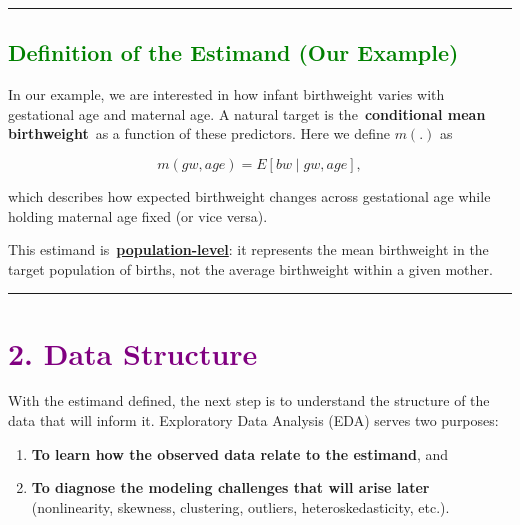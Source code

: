 \documentclass[
  letterpaper,
  DIV=11,
  numbers=noendperiod]{scrreprt}
\begin{document}
\begin{center}\rule{0.5\linewidth}{0.5pt}\end{center}

\hypertarget{section-53}{%
\subsection*{\texorpdfstring{\textcolor{green}{Definition of the Estimand (Our Example)}}{}}\label{section-53}}

In our example, we are interested in how infant birthweight varies with
gestational age and maternal age. A natural target is
the~\textbf{conditional mean birthweight}~as a function of these
predictors. Here we define \(m(.)\) as

\[
m(gw,age)=E[bw∣gw,age],
\]

which describes how expected birthweight changes across gestational age
while holding maternal age fixed (or vice versa).

This estimand is~\ul{\textbf{population-level}}: it represents the mean
birthweight in the target population of births, not the average
birthweight within a given mother.

\begin{center}\rule{0.5\linewidth}{0.5pt}\end{center}

\hypertarget{section-54}{%
\section*{\texorpdfstring{\textcolor{purple}{2. Data Structure}}{}}\label{section-54}}

\markright{\textcolor{purple}{2. Data Structure}}

With the estimand defined, the next step is to understand the structure
of the data that will inform it. Exploratory Data Analysis (EDA) serves
two purposes:

\begin{enumerate}
\def\labelenumi{\arabic{enumi}.}
\item
  \textbf{To learn how the observed data relate to the estimand}, and
\item
  \textbf{To diagnose the modeling challenges that will arise later}\\
  (nonlinearity, skewness, clustering, outliers, heteroskedasticity,
  etc.).
\end{enumerate}
\end{document}
